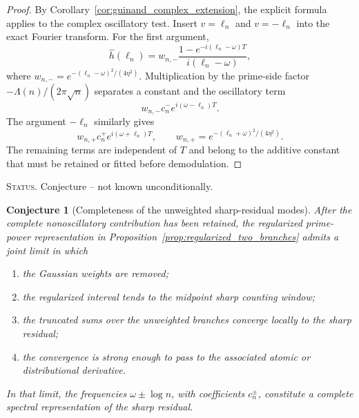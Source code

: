 \documentclass[11pt]{amsart}
\numberwithin{equation}{section}
\theoremstyle{plain}
\newtheorem{conjecture}[theorem]{Conjecture}
\theoremstyle{definition}
\theoremstyle{remark}
\newcommand{\1}{\mathbf{1}}
\newcommand{\statusnote}[1]{%
  \par\smallskip\noindent
  \begingroup\footnotesize\textsc{Status.} #1\endgroup
  \par\smallskip}
\begin{document}
\begin{proof}
By Corollary~\ref{cor:guinand_complex_extension}, the explicit formula
applies to the complex oscillatory test.  Insert \(v=\ell_n\) and
\(v=-\ell_n\) into the exact Fourier transform.
For the first argument,
\begin{equation}
\widehat h(\ell_n)
=
w_{n,-}
\frac{1-e^{-i(\ell_n-\omega)T}}
{i(\ell_n-\omega)},
\label{eq:branch_minus_fourier_insert}
\end{equation}
where \(w_{n,-}=e^{-(\ell_n-\omega)^2/(4\eta^2)}\).  Multiplication by the
prime-side factor \(-\Lambda(n)/(2\pi\sqrt n)\) separates a constant and
the oscillatory term
\begin{equation}
w_{n,-}c_n^-e^{i(\omega-\ell_n)T}.
\label{eq:branch_minus_oscillatory_proof}
\end{equation}
The argument \(-\ell_n\) similarly gives
\begin{equation}
w_{n,+}c_n^+e^{i(\omega+\ell_n)T},
\qquad
w_{n,+}=e^{-(\ell_n+\omega)^2/(4\eta^2)}.
\label{eq:branch_plus_oscillatory_proof}
\end{equation}
The remaining terms are independent of \(T\) and belong to the additive
constant that must be retained or fitted before demodulation.
\end{proof}

\statusnote{Conjecture -- not known unconditionally.}
\begin{conjecture}[Completeness of the unweighted sharp-residual modes]
\label{conj:regularized_to_sharp_completeness}
After the complete nonoscillatory contribution has been retained, the
regularized prime-power representation in
Proposition~\ref{prop:regularized_two_branches} admits a joint limit in which
\begin{enumerate}[label=\textup{(\roman*)}]
\item the Gaussian weights are removed;
\item the regularized interval tends to the midpoint sharp counting window;
\item the truncated sums over the unweighted branches converge locally to the
sharp residual;
\item the convergence is strong enough to pass to the associated atomic or
distributional derivative.
\end{enumerate}
In that limit, the frequencies \(\omega\pm\log n\), with coefficients
\(c_n^\pm\), constitute a complete spectral representation of the sharp
residual.
\end{conjecture}
\end{document}
